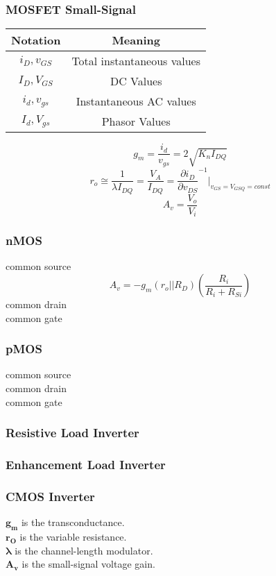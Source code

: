 \documentclass[landscape, 12pt]{report}
\begin{document}
\begin{multicols*}{3}
\subsubsection*{MOSFET Small-Signal}
\begin{center}
\begin{tabular}{c|c}
     Notation & Meaning \\
     \hline
     $i_D, v_{GS}$& Total instantaneous values  \\
     $I_D, V_{GS}$& DC Values \\
     $i_d, v_{gs}$& Instantaneous AC values \\
     $I_d, V_{gs}$& Phasor Values \\
\end{tabular}  
\begin{equation}
    g_m = \frac{i_d}{v_{gs}} = 2\sqrt{K_nI_{DQ}}
\end{equation}
\begin{equation}
    r_o \cong \frac{1}{\lambda I_{DQ}} = \frac{V_A}{I_{DQ}} = \frac{\partial i_D}{\partial v_{DS}}^{-1}\bigg|_{v_{GS}=V_{GSQ}=const}
\end{equation}
\begin{equation}
    A_v = \frac{V_o}{V_i} 
\end{equation}
\subsubsection*{nMOS}
common source
\begin{equation}
    A_v  = -g_m(r_o||R_D)(\frac{R_i}{R_i+R_{Si}})
\end{equation}
common drain\\
common gate
\subsubsection*{pMOS}
common source\\
common drain\\
common gate
\end{center}
\subsubsection*{Resistive Load Inverter}
\subsubsection*{Enhancement Load Inverter}
\subsubsection*{CMOS Inverter}
$\boldsymbol{g_m}$ is the transconductance.\\
$\boldsymbol{r_O}$ is the variable resistance.\\
$\boldsymbol{\lambda}$ is the channel-length modulator.\\
$\boldsymbol{A_v}$ is the small-signal voltage gain.
\end{multicols*}
\end{document}
